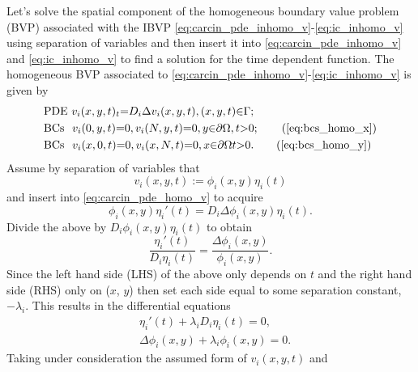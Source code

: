 \documentclass[\main/thesis.tex]{subfiles}
\begin{document}
Let's solve the spatial component of the homogeneous boundary value problem 
(BVP) associated with the IBVP 
\eqref{eq:carcin_pde_inhomo_v}-\eqref{eq:ic_inhomo_v} using separation of 
variables and then insert it into \eqref{eq:carcin_pde_inhomo_v} and 
\eqref{eq:ic_inhomo_v} to find a solution for the time dependent function.
The homogeneous BVP associated to 
\eqref{eq:carcin_pde_inhomo_v}-\eqref{eq:ic_inhomo_v} is given by
\begin{align}
	&\text{PDE }                 v_i(x, y, t)_t {=} D_i \Delta v_i(x, y, t),
	                             (x, y, t) {\in} \Gamma;
	                             \label{eq:carcin_pde_homo_v} \\
	&\text{BCs } \hspace{0.05in} v_i(0, y, t)   {=} 0,
	                             v_i(N, y, t)   {=} 0,
	                             y {\in} \partial \Omega, t {>} 0; 
	                             \tag{\ref{eq:bcs_homo_x}} \\
	&\text{BCs } \hspace{0.05in} v_i(x, 0, t)   {=} 0,
	                             v_i(x, N, t)   {=} 0,
	                             x {\in} \partial \Omega t {>} 0. 
	                             \tag{\ref{eq:bcs_homo_y}} 
\end{align}
Assume by separation of variables that 
\begin{equation*}
	v_i(x, y, t) {:=} \phi_i(x, y) \eta_i(t)
\end{equation*}
and insert into \eqref{eq:carcin_pde_homo_v} to acquire
\begin{equation*}
	\phi_i(x, y) \eta_i'(t) {=} D_i \Delta \phi_i(x, y) \eta_i(t).
\end{equation*}
Divide the above by $D_i \phi_i(x, y) \eta_i(t)$ to obtain
\begin{equation*}
	    \frac{\eta_i'(t)}
	         {D_i\eta_i(t)}
	{=} \frac{\Delta \phi_i(x, y)}
	         {\phi_i(x, y)}.
\end{equation*}
Since the left hand side (LHS) of the above only depends on $t$ and the right 
hand side (RHS) only on ($x$, $y$) then set each side equal to some separation 
constant, $\minus \lambda_i$.
This results in the differential equations
\begin{align}
	&\eta_i'(t) {+} \lambda_i D_i \eta_i(t) {=} 0,
	 \nonumber \\
	&\Delta \phi_i(x, y) {+} \lambda_i \phi_i(x, y) {=} 0.
	 \label{eq:spatial_pde}
\end{align}
Taking under consideration the assumed form of $v_i(x, y, t)$ and
\end{document}
